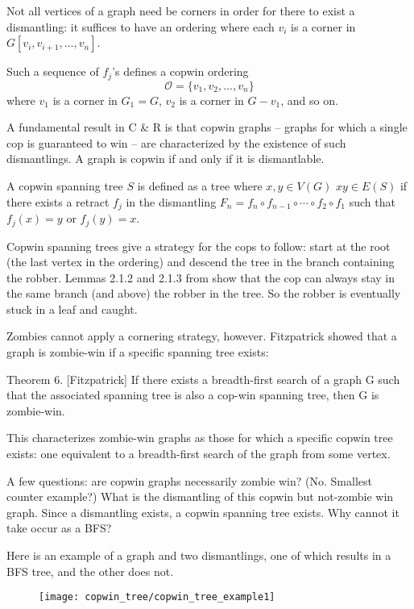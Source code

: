 Not all vertices of a graph need be corners in order for there
to exist a dismantling: it suffices to have an ordering where each $v_i$ is a corner in
$G[v_i, v_{i+1}, \dots, v_n]$.

Such a sequence of $f_j$'s defines a copwin ordering
\[ \mathcal{O} = \{ v_1, v_2, \dots, v_n\} \]
 where $v_1$ is a corner in $G_1 = G$, $v_2$ is a corner in $G - v_1$, and so on.

A fundamental result in C \& R is that copwin graphs -- graphs for which a single
cop is guaranteed to win --  are characterized by the existence of such dismantlings.
A graph is copwin if and only if it is dismantlable.

A copwin spanning tree $S$ is defined as a tree where $x,y\in V(G)$
$xy \in E(S)$ if there exists a retract $f_j$ in the dismantling
$F_n = f_{n} \circ f_{n-1} \circ \cdots \circ f_{2} \circ f_1$
such that $f_j (x) = y$ or $f_j (y) = x$.

Copwin spanning trees give a strategy for the cops to follow: start at the root
(the last vertex in the ordering) and descend the tree in the branch containing the robber.
Lemmas 2.1.2 and 2.1.3 from \cite{clarke2002constrained} show that the cop
can always stay in the same branch (and above) the robber in the tree. So the
robber is eventually stuck in a leaf and caught.

Zombies cannot apply a cornering strategy, however. Fitzpatrick showed that a
graph is zombie-win if a specific spanning tree exists:

Theorem 6. [Fitzpatrick] If there exists a breadth-first search of a graph G such that the associated spanning tree is also a cop-win spanning tree, then G is zombie-win.

This characterizes zombie-win graphs as those for which a specific copwin tree exists: one equivalent
to a breadth-first search of the graph from some vertex.

A few questions: are copwin graphs necessarily zombie win? (No. Smallest counter example?)
What is the dismantling of this copwin but not-zombie win graph. Since a dismantling exists,
a copwin spanning tree exists. Why cannot it take occur as a BFS?

Here is an example of a graph and two dismantlings, one of which results in a BFS tree,
and the other does not.

\begin{figure}[h!]
\centering
\texttt{[image: copwin\_tree/copwin\_tree\_example1]}
\end{figure}

